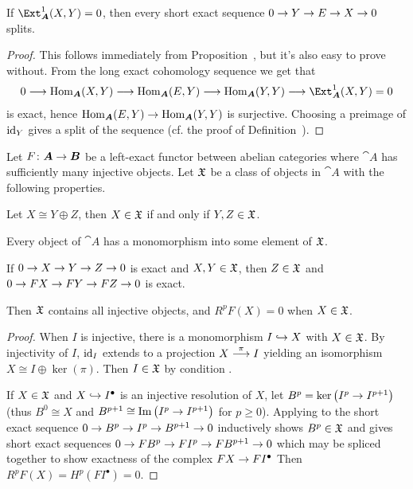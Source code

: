 \documentclass[a4paper,parskip=half,numbers=enddot, DIV=12]{scrreprt}
\renewcommand{\geq}{\geqslant}
\begin{document}
\begin{cor}
	If $\Ext_{\cat A}^1(X,Y)=0$, then every short exact sequence $0\morphism Y\morphism E\morphism X\morphism 0$ splits.
\end{cor}
\begin{proof}
	This follows immediately from Proposition~, but it's also easy to prove without. From the long exact cohomology sequence  we get that
	\begin{align*}
		0\morphism\Hom_{\cat A}(X,Y)\morphism\Hom_{\cat A}(E,Y)\morphism\Hom_{\cat A}(Y,Y)\morphism \Ext_{\cat A}^1(X,Y)=0
	\end{align*}
	is exact, hence $\Hom_{\cat A}(E,Y)\morphism\Hom_{\cat A}(Y,Y)$ is surjective. Choosing a preimage of $\operatorname{id}_Y$ gives a split of the sequence (cf. the proof of Definition~).
\end{proof}
\begin{prop}
	Let $F\colon {\cat A}\morphism{\cat B}$ be a left-exact functor between abelian categories where ${\cat A}$ has sufficiently many injective objects. Let $\mathfrak{X}$ be a class of objects in ${\cat A}$ with the following properties.
	\begin{alphanumerate}
		\item Let $X\cong Y\oplus Z$, then $X\in\mathfrak{X}$ if and only if $Y,Z\in\mathfrak{X}$.
		\item Every object of ${\cat A}$ has a monomorphism into some element of $\mathfrak{X}$.
		\item If $0\morphism X\morphism Y\morphism Z\morphism 0$ is exact and $X,Y\in\mathfrak{X}$, then $Z\in\mathfrak{X}$ and $0\morphism FX\morphism FY\morphism FZ\morphism 0$  is exact.
	\end{alphanumerate}
	Then $\mathfrak{X}$ contains all injective objects, and $R^pF(X)=0$ when $X\in\mathfrak{X}$.
\end{prop}
\begin{proof}
	When $I$ is injective, there is a monomorphism $I\monomorphism X$ with $X\in \mathfrak{X}$. By injectivity of $I$, $\operatorname{id}_I$ extends to a projection $X\morphism[\pi]I$ yielding an isomorphism $X\cong I\oplus\ker(\pi)$. Then $I\in\mathfrak{X}$ by condition .
	
	If $X\in\mathfrak{X}$ and $X\monomorphism I^\bullet$ is an injective resolution of $X$, let $B^p=\ker\left(I^p\morphism I^{p+1}\right)$ (thus $B^0\cong X$ and $B^{p+1}\cong \Im\left(I^p\morphism I^{p+1}\right)$ for $p\geq 0$). Applying  to the short exact sequence $0\morphism B^p\morphism I^p\morphism B^{p+1}\morphism 0$ inductively shows $B^p\in \mathfrak{X}$ and gives short exact sequences $0\morphism FB^p\morphism FI^p\morphism FB^{p+1}\morphism 0$ which may be spliced together to show exactness of the complex $FX\morphism FI^\bullet$ Then $R^pF(X)=H^p(FI^\bullet)=0$.
\end{proof}
\end{document}
